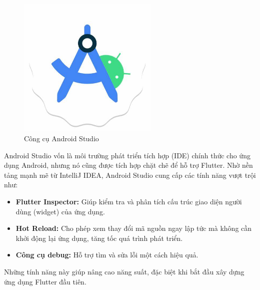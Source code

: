\documentclass[../DoAn.tex]{subfiles}
\numberwithin{figure}{chapter}
\begin{document}
\begin{figure}[H]
    \centering
    \includegraphics[width=0.6\textwidth]{Hinhve/Chuong5/androidstudio.jpg}
    \caption{Công cụ Android Studio}
    \label{fig:androidstudio}
\end{figure}

Android Studio vốn là môi trường phát triển tích hợp (IDE) chính thức cho ứng dụng Android, nhưng nó cũng được tích hợp chặt chẽ để hỗ trợ Flutter. Nhờ nền tảng mạnh mẽ từ IntelliJ IDEA, Android Studio cung cấp các tính năng vượt trội như:
\begin{itemize}
    \item \textbf{Flutter Inspector: } Giúp kiểm tra và phân tích cấu trúc giao diện người dùng (widget) của ứng dụng.
    \item \textbf{Hot Reload: } Cho phép xem thay đổi mã nguồn ngay lập tức mà không cần khởi động lại ứng dụng, tăng tốc quá trình phát triển.
    \item \textbf{Công cụ debug: } Hỗ trợ tìm và sửa lỗi một cách hiệu quả.
\end{itemize}

Những tính năng này giúp nâng cao năng suất, đặc biệt khi bắt đầu xây dựng ứng dụng Flutter đầu tiên.
\end{document}
